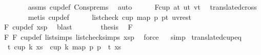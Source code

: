 \begin{isabellebody}
\ \ \ \ \ \ \isamarkupfalse%
\ assms\ cup{\isacharunderscore}{\kern0pt}def\ Cons{\isachardot}{\kern0pt}prems\ \isamarkupfalse%
\ auto\isanewline
\ \ \ \ \isamarkupfalse%
\ F{}{\isacharcolon}{\kern0pt}{\isachardoublequoteopen}cup{}\ {\isacharparenleft}{\kern0pt}a{\isacharplus}{\kern0pt}t{\isacharparenright}{\kern0pt}\ {\isacharparenleft}{\kern0pt}u{\isacharplus}{\kern0pt}t{\isacharparenright}{\kern0pt}\ {\isacharparenleft}{\kern0pt}v{\isacharplus}{\kern0pt}t{\isacharparenright}{\kern0pt}{\isachardoublequoteclose}\ \isamarkupfalse%
\ translated{\isacharunderscore}{\kern0pt}cross{}\isanewline
\ \ \ \ \ \ \isamarkupfalse%
\ {\isacharparenleft}{\kern0pt}metis\ cup{}{\isacharunderscore}{\kern0pt}def{\isacharparenright}{\kern0pt}\isanewline
\ \ \ \ \isamarkupfalse%
\ {\isachardoublequoteopen}list{\isacharunderscore}{\kern0pt}check\ cup{}\ {\isacharparenleft}{\kern0pt}map\ {\isacharparenleft}{\kern0pt}{\isasymlambda}p{\isachardot}{\kern0pt}\ p{\isacharplus}{\kern0pt}t{\isacharparenright}{\kern0pt}\ {\isacharparenleft}{\kern0pt}u{\isacharhash}{\kern0pt}v{\isacharhash}{\kern0pt}rest{\isacharparenright}{\kern0pt}{\isacharparenright}{\kern0pt}{\isachardoublequoteclose}\isanewline
\ \ \ \ \ \ \isamarkupfalse%
\ F{}\ cup{\isacharunderscore}{\kern0pt}def\ xsp\ \isamarkupfalse%
\ blast\isanewline
\ \ \ \ \isamarkupfalse%
\ \isamarkupfalse%
\ {\isacharquery}{\kern0pt}thesis\ \isamarkupfalse%
\ F{}\isanewline
\ \ \ \ \ \ \isamarkupfalse%
\ F{}\ F{}\ cup{\isacharunderscore}{\kern0pt}def\ list{\isachardot}{\kern0pt}simps{\isacharparenleft}{\kern0pt}{}{\isacharparenright}{\kern0pt}\ list{\isacharunderscore}{\kern0pt}check{\isachardot}{\kern0pt}simps{\isacharparenleft}{\kern0pt}{}{\isacharparenright}{\kern0pt}\ xsp\ \isamarkupfalse%
\ force\isanewline
\ \ \isamarkupfalse%
\isanewline
{}\isamarkupfalse%
{\isacharparenleft}{\kern0pt}simp{\isacharparenright}{\kern0pt}%
\endisatagproof
{\isafoldproof}%
%
\isadelimproof
%
\endisadelimproof
\isanewline
\isanewline
{}\isamarkupfalse%
\ translated{\isacharunderscore}{\kern0pt}cup{\isacharunderscore}{\kern0pt}eq{\isacharcolon}{\kern0pt}\isanewline
\ \ {\isachardoublequoteopen}{\isasymAnd}t{\isachardot}{\kern0pt}\ cup\ k\ xs\ {\isacharequal}{\kern0pt}\ cup\ k\ {\isacharparenleft}{\kern0pt}map\ {\isacharparenleft}{\kern0pt}{\isasymlambda}p{\isachardot}{\kern0pt}\ p\ {\isacharplus}{\kern0pt}\ t{\isacharparenright}{\kern0pt}\ xs{\isacharparenright}{\kern0pt}{\isachardoublequoteclose}\isanewline

\end{isabellebody}
